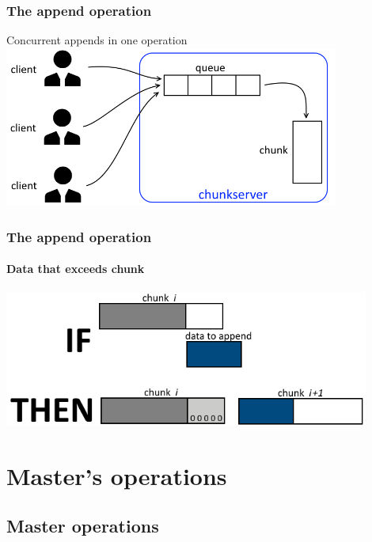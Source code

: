 \documentclass{beamer}
\newcommand{\slidewidth}{12cm}
\begin{document}
\begin{frame}
 \frametitle{The append operation}
 Concurrent appends in \alert{one} operation\\\vspace{0.5cm}
 \centering
 \includegraphics[width=11cm]{figures/appendsschema.png}
\end{frame}

\begin{frame}
 \frametitle{The append operation}
 \framesubtitle{Data that exceeds chunk}
 \centering
 \includegraphics[width=\slidewidth]{figures/appends2schema.png}
\end{frame}

\section{Master's operations}
\subsection{Master operations}
\end{document}
